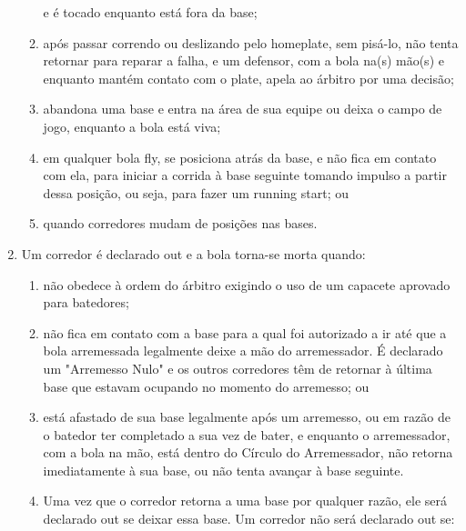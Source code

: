 \begin{enumerate}[label=(\alph*)]
\begin{enumerate}[label=\roman*.]
 e é tocado enquanto está fora da base;
\item  após passar correndo ou deslizando pelo \gls{homeplate}, sem pisá-lo, não tenta retornar para reparar a falha, e um defensor, com a bola na(s) mão(s) e enquanto mantém contato com o \gls{plate}, apela ao árbitro por uma decisão;
\item  abandona uma base e entra na área de sua equipe ou deixa o campo de jogo, enquanto a bola está viva;
\item  em qualquer bola \gls{fly}, se posiciona atrás da base, e não fica em contato com ela, para iniciar a corrida à base seguinte tomando impulso a partir dessa posição, ou seja, para fazer um \gls{running start}; ou
\item  quando corredores mudam de posições nas bases.
\end{enumerate}
	\item  Um corredor é declarado \gls{out} e a bola torna-se morta quando:

	 \begin{enumerate}[label=\roman*.]
	 	\item não obedece à ordem do árbitro exigindo o uso de um capacete aprovado para batedores;
		\item não fica em contato com a base para a qual foi autorizado a ir até que a bola arremessada legalmente deixe a mão do arremessador.
		 É declarado um "Arremesso Nulo" e os outros corredores têm de retornar à última base que estavam ocupando no momento do arremesso; ou
		\item  está afastado de sua base legalmente após um arremesso, ou em razão de o batedor ter completado a sua vez de bater, e enquanto o arremessador, com a bola na mão, está dentro do Círculo do Arremessador, não retorna imediatamente à sua base, ou não tenta avançar à base seguinte.
		\item  Uma vez que o corredor retorna a uma base por qualquer razão, ele
		 será declarado \gls{out} se deixar essa base. Um corredor não será
		 declarado \gls{out} se:


\end{enumerate}
\end{enumerate}

